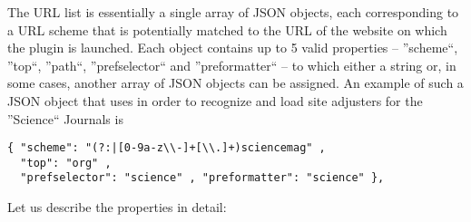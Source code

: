 \documentclass[
a4paper,
12pt,
]
{article}
\begin{document}
 The URL list is essentially a single array of JSON objects, each corresponding to a URL scheme that is potentially matched to the URL of the website on which the plugin is launched. Each object contains up to 5 valid properties -- ''scheme``, ''top``, ''path``, ''prefselector`` and ''preformatter`` -- to which either a string or, in some cases, another array of JSON objects can be assigned. An example of such a JSON object that {\plgname } uses in order to recognize and load site adjusters for the ''Science`` Journals is
 \begin{center}
\begin{lstlisting}
{ "scheme": "(?:|[0-9a-z\\-]+[\\.]+)sciencemag" ,
  "top": "org" ,
  "prefselector": "science" , "preformatter": "science" },
\end{lstlisting}
\end{center}
 Let us describe the properties in detail:
\end{document}
